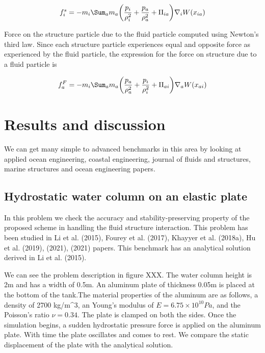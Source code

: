 \documentclass[preprint,12pt]{elsarticle}
\begin{document}
\begin{equation}
  f_i^s = -m_i \Sum_{a} m_a \bigg(\frac{p_i}{\rho_{i}^2} +
  \frac{p_a}{\rho_{a}^2} + \Pi_{ia} \bigg) \nabla_{i} W(x_{ia})
\end{equation}

Force on the structure particle due to the fluid particle computed using
Newton's third law. Since each structure particle experiences equal and
opposite force as experienced by the fluid particle, the expression for the
force on structure due to a fluid particle is

\begin{equation}
  f_a^F = -m_i \Sum_{a} m_a \bigg(\frac{p_a}{\rho_{a}^2} +
  \frac{p_i}{\rho_{i}^2} + \Pi_{ai} \bigg) \nabla_{a} W(x_{ai})
\end{equation}




\section{Results and discussion}
\label{sec:results}

We can get many simple to advanced benchmarks in this area by looking at
applied ocean engineering, coastal engineering, journal of fluids and
structures, marine structures and ocean engineering papers.



\subsection{Hydrostatic water column on an elastic plate}
\label{sec:results:hstank-elastic-plate}


In this problem we check the accuracy and stability-preserving property of the
proposed scheme in handling the fluid structure interaction. This problem has
been studied in Li et al. (2015), Fourey et al. (2017), Khayyer et
al. (2018a), Hu et al. (2019), (2021), (2021) papers. This benchmark has an
analytical solution derived in Li et al. (2015).

We can see the problem description in figure XXX. The water column height is
2m and has a width of 0.5m. An aluminum plate of thickness 0.05m is placed at
the bottom of the tank.The material properties of the aluminum are as follows,
a density of 2700 kg/m^3, an Young’s modulus of $E = 6.75 \times 10^{10} Pa$,
and the Poisson’s ratio $\nu = 0.34$. The plate is clamped on both the
sides. Once the simulation begins, a sudden hydrostatic pressure force is
applied on the aluminum plate. With time the plate oscillates and comes to
rest. We compare the static displacement of the plate with the analytical
solution.
\end{document}
